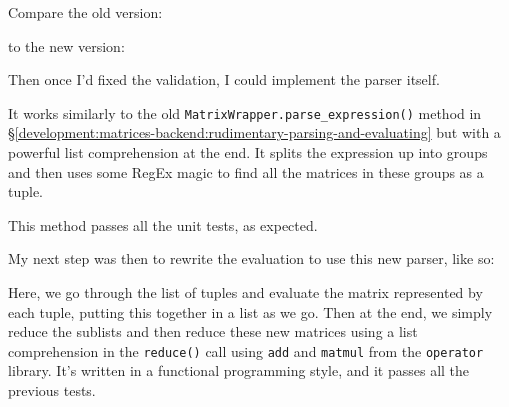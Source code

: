 \documentclass[../development.tex]{subfiles}
\begin{document}
Compare the old version:


to the new version:


Then once I'd fixed the validation, I could implement the parser itself.


It works similarly to the old \texttt{MatrixWrapper.parse_expression()} method in \S\ref{development:matrices-backend:rudimentary-parsing-and-evaluating} but with a powerful list comprehension at the end. It splits the expression up into groups and then uses some RegEx magic to find all the matrices in these groups as a tuple.

This method passes all the unit tests, as expected.

My next step was then to rewrite the evaluation to use this new parser, like so:


Here, we go through the list of tuples and evaluate the matrix represented by each tuple, putting this together in a list as we go. Then at the end, we simply reduce the sublists and then reduce these new matrices using a list comprehension in the \texttt{reduce()} call using \texttt{add} and \texttt{matmul} from the \texttt{operator} library. It's written in a functional programming style, and it passes all the previous tests.
\end{document}
